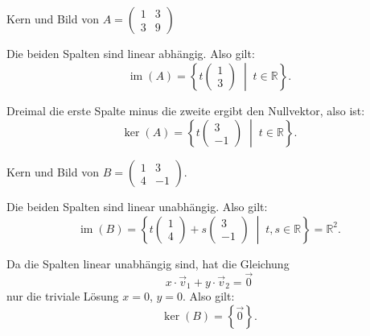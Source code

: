 \begin{bsp}
    {Kern und Bild von $A = \begin{pmatrix} 1 & 3 \\ 3 & 9 \end{pmatrix}$ }{}


Die beiden Spalten sind linear abhängig.  
Also gilt:
\[
\operatorname{im}(A) = \left\{ t \begin{pmatrix} 1 \\ 3 \end{pmatrix} \;\middle|\; t \in \mathbb{R} \right\}.
\]

Dreimal die erste Spalte minus die zweite ergibt den Nullvektor, also ist:
\[
\ker(A) = \left\{ t \begin{pmatrix} 3 \\ -1 \end{pmatrix} \;\middle|\; t \in \mathbb{R} \right\}.
\]

\end{bsp}

\begin{bsp}
{Kern und Bild von $B = \begin{pmatrix} 1 & 3 \\ 4 & -1 \end{pmatrix}.$}{}


Die beiden Spalten sind linear unabhängig.  
Also gilt:
\[
\operatorname{im}(B) = \left\{ t \begin{pmatrix} 1 \\ 4 \end{pmatrix} + s \begin{pmatrix} 3 \\ -1 \end{pmatrix} \;\middle|\; t, s \in \mathbb{R} \right\} = \mathbb{R}^2.
\]

Da die Spalten linear unabhängig sind, hat die Gleichung
\[
x \cdot \vec{v}_1 + y \cdot \vec{v}_2 = \vec{0}
\]
nur die triviale Lösung \( x = 0 \), \( y = 0 \).  
Also gilt:
\[
\ker(B) = \left\{ \vec{0} \right\}.
\]

\end{bsp}



